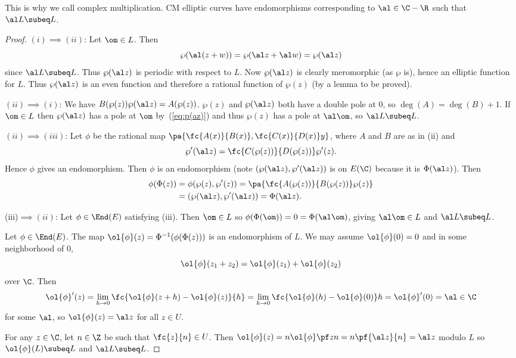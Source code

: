 This is why we call complex multiplication. CM elliptic curves have endomorphisms corresponding to $\al\in \C-\R$ such that $\al L\subeq L$.
\begin{proof}
$(i)\implies (ii)$: Let $\om\in L$. Then
\begin{equation}\label{eq:p(az)}
\wp(\al(z+w))=\wp(\al z+\al w)=\wp(\al z)
\end{equation}
since $\al L\subeq L$. Thus $\wp(\al z)$ is periodic with respect to $L$. Now $\wp(\al z)$ is clearly meromorphic (as $\wp$ is), hence an elliptic function for $L$. Thus $\wp(\al z)$ is an even function and therefore a rational function of $\wp(z)$ (by a lemma to be proved).

$(ii)\implies (i)$: We have $B(\wp(z))\wp(\al z)=A(\wp(z))$. $\wp(z)$ and $\wp(\al z)$ both have a double pole at 0, so $\deg(A)=\deg(B)+1$. If $\om\in L$ then $\wp(\al z)$ has a pole at $\om$ by~(\ref{eq:p(az)}) and thus $\wp(z)$ has a pole at $\al \om$, so $\al L\subeq L$.

$(ii)\implies (iii)$: Let $\phi$ be the rational map $\pa{\fc{A(x)}{B(x)},\fc{C(x)}{D(x)}y}$, where $A$ and $B$ are as in (ii) and 
\[
\wp'(\al z)=\fc{C(\wp(z))}{D(\wp(z))}\wp'(z).
\] 
Hence $\phi$ gives an endomorphism. Then $\phi$ is an endomorphism (note $(\wp(\al z),\wp'(\al z))$ is on $E(\C)$ because it is $\Phi(\al z)$). Then
\begin{align*}
\phi(\Phi(z))&= \phi(\wp(z),\wp'(z)) =\pa{\fc{A(\wp(z))}{B(\wp(z))} \wp(z)}\\
&=(\wp(\al z),\wp'(\al z))=\Phi(\al z).
\end{align*}

(iii)$\implies (ii)$: Let $\phi\in \End(E)$ satisfying (iii). Then $\om\in L$ so $\phi(\Phi(\om))=0=\Phi(\al \om)$, giving $\al\om \in L$ and $\al L\subeq L$.

Let $\phi\in \End(E)$. The map $\ol{\phi}(z)=\Phi^{-1}(\phi(\Phi(z)))$ is an endomorphism of $L$. We may assume $\ol{\phi}(0)=0$ and in some neighborhood of 0, 
\[
\ol{\phi}(z_1+z_2)=\ol{\phi}(z_1)+\ol{\phi}(z_2)
\]
over $\C$. Then
\[
\ol{\phi}'(z)=\lim_{h\to 0}\fc{\ol{\phi}(z+h)-\ol{\phi}(z)}{h}
=\lim_{h\to 0}\fc{\ol{\phi}(h)-\ol{\phi}(0)}h = \ol{\phi}'(0)=\al\in \C
\]
for some $\al$, so $\ol{\phi}(z)=\al z$ for all $z\in U$.

For any $z\in \C$, let $n\in \Z$ be such that $\fc{z}{n}\in U$. Then $\ol{\phi}(z)=n\ol{\phi}\pf zn=n\pf{\al z}{n}=\al z$ modulo $L$ so $\ol{\phi}(L)\subeq L$ and $\al L\subeq L$.


\end{proof}
